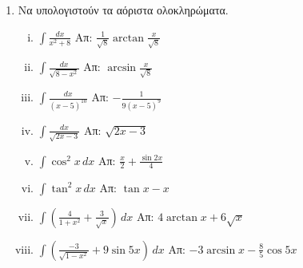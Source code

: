 


\pagestyle{askhseis}
\everymath{\displaystyle}

\geometry{left=15.63mm,right=15.63mm,top=30.25mm,bottom=34.25mm,footskip=24.16mm,headsep=24.16mm}


\begin{center}
  \minibox{\bfseries\large \textcolor{Col1}{Ασκήσεις στα Αόριστα Ολοκληρώματα}}
\end{center}

\vspace{\baselineskip}

\begin{enumerate}

  \item Να υπολογιστούν τα αόριστα ολοκληρώματα.
    \begin{enumerate}[i)]
      \item $\int\frac{dx}{x^2+8} $ 
        \hfill Απ: $\frac{1}{\sqrt{8}} \arctan \frac{x}{\sqrt{8}}$
      \item $\int\frac{dx}{\sqrt{8-x^{2}}} $ \hfill Απ: $\arcsin \frac{x}{\sqrt{8}}$
      \item $\int\frac{dx}{(x-5)^{10}} $ \hfill Απ: $-\frac{1}{9(x-5)^9}$
      \item $ \int\frac{dx}{\sqrt{2x-3}}$ \hfill Απ: $ \sqrt{2x-3} $
      \item $\int\cos^2x \, dx$ \hfill Απ: $\frac{x}{2} + \frac{\sin2x}{4}$
      \item $\int\tan^2x \, dx$ \hfill Απ: $ \tan{x} - x$
      \item $ \int \left(\frac{4}{1+x^{2}} + \frac{3}{\sqrt{x}}\right) \,{dx} $ 
        \hfill Απ: $ 4 \arctan x + 6 \sqrt{x} $
      \item $ \int \left(\frac{-3}{\sqrt{1 - x^{2}}} + 9 \sin{5x}\right) \,{dx}  $ 
        \hfill Απ: $ -3 \arcsin x - \frac{8}{5} \cos{5x} $
    \end{enumerate}


\end{enumerate}

